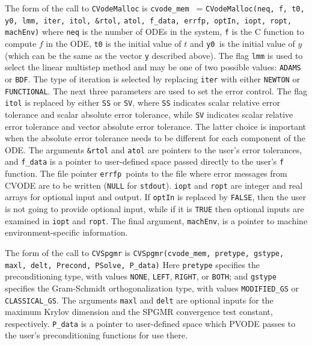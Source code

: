 The form of the call to {\tt CVodeMalloc} is 
\newline
\hspace*{.4in} {\tt cvode\_mem } = {\tt CVodeMalloc(neq, f, 
t0, y0, lmm, iter, itol, \&rtol,} 
\newline \hspace*{1.9in} {\tt atol, f\_data, errfp, optIn, iopt, ropt, machEnv)}
\newline where {\tt neq} is the number of ODEs in the system, {\tt f}
is the C function to compute $f$ in the ODE, {\tt t0} is the initial
value of $t $ and {\tt y0 }is the initial value of $y$ (which can be
the same as the vector {\tt y} described above). The flag {\tt lmm} is
used to select the linear multistep method and may be one of two
possible values: {\tt ADAMS} or {\tt BDF}. The type of iteration is
selected by replacing {\tt iter} with either {\tt NEWTON} or {\tt
FUNCTIONAL}. The next three parameters are used to set the error
control. The flag {\tt itol} is replaced by either {\tt SS} or 
{\tt SV}, where {\tt SS} indicates scalar relative error tolerance and
scalar absolute error tolerance, while {\tt SV} indicates scalar
relative error tolerance and vector absolute error tolerance. The
latter choice is important when the absolute error tolerance needs to
be different for each component of the ODE. The arguments {\tt \&rtol}
and {\tt atol} are pointers to the user's error tolerances, and 
{\tt f\_data} is a pointer to user-defined space passed directly to
the user's {\tt f} function. The file pointer {\tt errfp }points to
the file where error messages from CVODE are to be written ({\tt NULL}
for {\tt stdout}). {\tt iopt} and {\tt ropt} are integer and real
arrays for optional input and output. If {\tt optIn} is replaced by
{\tt FALSE}, then the user is not going to provide optional input,
while if it is {\tt TRUE} then optional inputs are examined in 
{\tt iopt} and {\tt ropt}. The final argument, {\tt machEnv}, is a
pointer to machine environment-specific information.

The form of the call to {\tt CVSpgmr} is 
\newline \hspace*{.35in} {\tt CVSpgmr(cvode\_mem, pretype, gstype, maxl, delt, 
 Precond, PSolve, P\_data)} 
\newline Here {\tt pretype} specifies the preconditioning type, with
values {\tt NONE}, {\tt LEFT}, {\tt RIGHT}, or {\tt BOTH}; and 
{\tt gstype} specifies the Gram-Schmidt orthogonalization type, with
values {\tt MODIFIED\_GS} or {\tt CLASSICAL\_GS}. The arguments
{\tt maxl} and {\tt delt} are optional inputs for the maximum Krylov
dimension and the SPGMR convergence test constant, respectively. 
{\tt P\_data} is a pointer to user-defined space which PVODE passes to
the user's preconditioning functions for use there.

